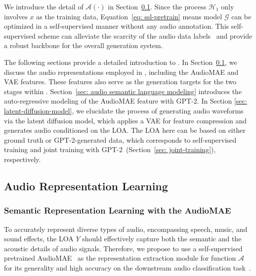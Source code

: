 \documentclass[lettersize,journal]{IEEEtran}
\begin{document}
\noindent
We introduce the detail of $\mathcal{A}(\cdot)$ in Section~\ref{sec: audio-representation-learning}. Since the process $\mathcal{H}_{1}$ only involves $x$ as the training data, Equation~\eqref{eq: ssl-pretrain} means model $\mathcal{G}$ can be optimized in a self-supervised manner without any audio annotation. This self-supervised scheme can alleviate the scarcity of the audio data labels~\cite{liu2023audioldm} and provide a robust backbone for the overall generation system.

The following sections provide a detailed introduction to \vModelName. 
In Section~\ref{sec: audio-representation-learning}, we discuss the audio representations employed in \vModelName, including the AudioMAE and VAE features. These features also serve as the generation targets for the two stages within \vModelName.
Section~\ref{sec: audio semantic language modeling} introduces the auto-regressive modeling of the AudioMAE feature with GPT-2. 
In Section \ref{sec: latent-diffusion-model}, we elucidate the process of generating audio waveforms via the latent diffusion model, which applies a VAE for feature compression and generates audio conditioned on the LOA. The LOA here can be based on either ground truth or GPT-2-generated data, which corresponds to self-supervised training and joint training with GPT-2~(Section~\ref{sec: joint-training}), respectively.








 
 








\subsection{Audio Representation Learning}
\label{sec: audio-representation-learning}



\subsubsection{Semantic Representation Learning with the AudioMAE}
\label{sec:representation-learning-modules}

\noindent
To accurately represent diverse types of audio, encompassing speech, music, and sound effects, the LOA $Y$ should effectively capture both the semantic and the acoustic details of audio signals.
Therefore, we propose to use a self-supervised pretrained AudioMAE~\cite{xu2022masked} as the representation extraction module for function $\mathcal{A}$ for its generality and high accuracy on the downstream audio classification task~\cite{xu2022masked}. 
\end{document}
